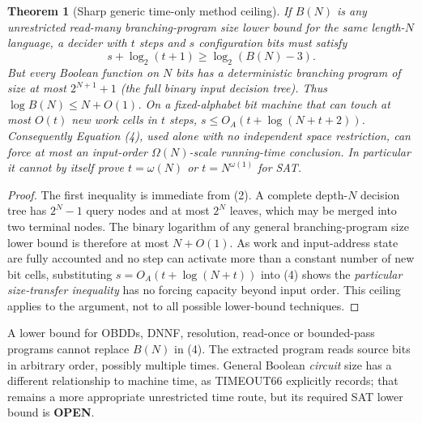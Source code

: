 \documentclass[11pt]{article}
\newtheorem{theorem}{Theorem}
\newcommand{\OPEN}{\textbf{OPEN}}
\begin{document}
\begin{theorem}[Sharp generic time-only method ceiling]
If $B(N)$ is any \emph{unrestricted read-many} branching-program size lower bound for the same length-$N$ language, a decider with $t$ steps and $s$ configuration bits must satisfy
\[
 s+\log_2(t+1)\ge\log_2(B(N)-3). \tag{4}
\]
But every Boolean function on $N$ bits has a deterministic branching program of size at most $2^{N+1}+1$ (the full binary input decision tree). Thus $\log B(N)\le N+O(1)$. On a fixed-alphabet bit machine that can touch at most $O(t)$ new work cells in $t$ steps, $s\le O_A(t+\log(N+t+2))$. Consequently Equation (4), \emph{used alone with no independent space restriction}, can force at most an input-order $\Omega(N)$-scale running-time conclusion. In particular it cannot by itself prove $t=\omega(N)$ or $t=N^{\omega(1)}$ for SAT.
\end{theorem}
\begin{proof}
The first inequality is immediate from (2). A complete depth-$N$ decision tree has $2^N-1$ query nodes and at most $2^N$ leaves, which may be merged into two terminal nodes. The binary logarithm of any general branching-program size lower bound is therefore at most $N+O(1)$. As work and input-address state are fully accounted and no step can activate more than a constant number of new bit cells, substituting $s=O_A(t+\log(N+t))$ into (4) shows the \emph{particular size-transfer inequality} has no forcing capacity beyond input order. This ceiling applies to the argument, not to all possible lower-bound techniques.
\end{proof}
A lower bound for OBDDs, DNNF, resolution, read-once or bounded-pass programs cannot replace $B(N)$ in (4). The extracted program reads source bits in arbitrary order, possibly multiple times. General Boolean \emph{circuit} size has a different relationship to machine time, as TIMEOUT66 explicitly records; that remains a more appropriate unrestricted time route, but its required SAT lower bound is \OPEN.
\end{document}
